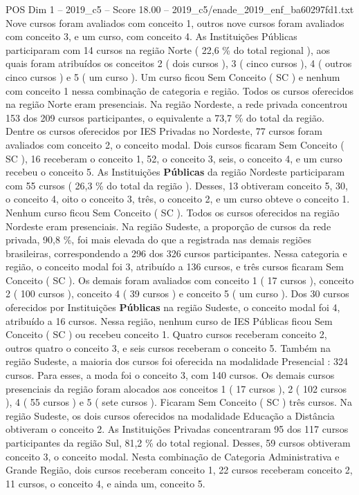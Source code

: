 \begin{textsample}{POS Dim 1 – 2019\_c5 – Score 18.00 – 2019\_c5/enade\_2019\_enf\_ba60297fd1.txt}
Nove cursos foram avaliados com conceito 1, outros nove cursos foram avaliados com conceito 3, e um curso, com conceito 4.
As Instituições Públicas participaram com 14 cursos na região Norte ( 22,6 \% do total regional ), aos quais foram atribuídos os conceitos 2 ( dois cursos ), 3 ( cinco cursos ), 4 ( outros cinco cursos ) e 5 ( um curso ).
Um curso ficou Sem Conceito ( SC ) e nenhum com conceito 1 nessa combinação de categoria e região.
Todos os cursos oferecidos na região Norte eram presenciais.
Na região Nordeste, a rede privada concentrou 153 dos 209 cursos participantes, o equivalente a 73,7 \% do total da região.
Dentre os cursos oferecidos por IES Privadas no Nordeste, 77 cursos foram avaliados com conceito 2, o conceito modal.
Dois cursos ficaram Sem Conceito ( SC ), 16 receberam o conceito 1, 52, o conceito 3, seis, o conceito 4, e um curso recebeu o conceito 5.
As Instituições \textbf{Públicas} da região Nordeste participaram com 55 cursos ( 26,3 \% do total da região ).
Desses, 13 obtiveram conceito 5, 30, o conceito 4, oito o conceito 3, três, o conceito 2, e um curso obteve o conceito 1.
Nenhum curso ficou Sem Conceito ( SC ).
Todos os cursos oferecidos na região Nordeste eram presenciais.
Na região Sudeste, a proporção de cursos da rede privada, 90,8 \%, foi mais elevada do que a registrada nas demais regiões brasileiras, correspondendo a 296 dos 326 cursos participantes.
Nessa categoria e região, o conceito modal foi 3, atribuído a 136 cursos, e três cursos ficaram Sem Conceito ( SC ).
Os demais foram avaliados com conceito 1 ( 17 cursos ), conceito 2 ( 100 cursos ), conceito 4 ( 39 cursos ) e conceito 5 ( um curso ).
Dos 30 cursos oferecidos por Instituições \textbf{Públicas} na região Sudeste, o conceito modal foi 4, atribuído a 16 cursos.
Nessa região, nenhum curso de IES Públicas ficou Sem Conceito ( SC ) ou recebeu conceito 1.
Quatro cursos receberam conceito 2, outros quatro o conceito 3, e seis cursos receberam o conceito 5.
Também na região Sudeste, a maioria dos cursos foi oferecida na modalidade Presencial : 324 cursos.
Para esses, a moda foi o conceito 3, com 140 cursos.
Os demais cursos presenciais da região foram alocados aos conceitos 1 ( 17 cursos ), 2 ( 102 cursos ), 4 ( 55 cursos ) e 5 ( sete cursos ).
Ficaram Sem Conceito ( SC ) três cursos.
Na região Sudeste, os dois cursos oferecidos na modalidade Educação a Distância obtiveram o conceito 2.
As Instituições Privadas concentraram 95 dos 117 cursos participantes da região Sul, 81,2 \% do total regional.
Desses, 59 cursos obtiveram conceito 3, o conceito modal.
Nesta combinação de Categoria Administrativa e Grande Região, dois cursos receberam conceito 1, 22 cursos receberam conceito 2, 11 cursos, o conceito 4, e ainda um, conceito 5.

\end{textsample}

